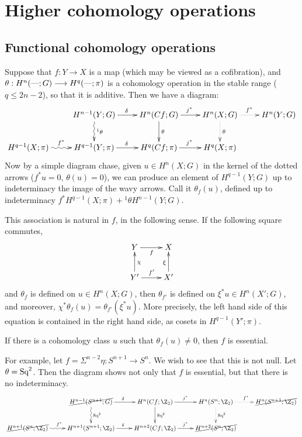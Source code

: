 \documentclass[11pt]{article}
\begin{document}
\section{Higher cohomology operations}
\subsection{Functional cohomology operations}
Suppose that $f:Y\to X$ is a map (which may be viewed as a cofibration), and 
$\theta:H^n(\textup{---};G)\longrightarrow H^q(\textup{---};\pi)$ is a cohomology operation in the stable
range ($q\leq2n-2$), so that it is additive.
Then we have a diagram:
\[\xymatrix{
&H^{n-1}(Y;G)\ar[r]^\delta\ar@{~>}[d]^{^1\theta}&
H^n(Cf;G)\ar[r]^{j^*}\ar[d]^\theta&
H^n(X;G)\ar@{.>}[r]^{f^*}\ar@{.>}[d]^\theta&
H^n(Y;G)\\
H^{q-1}(X;\pi)\ar@{~>}[r]^{f^*}&
H^{q-1}(Y;\pi)\ar[r]^\delta&
H^q(Cf;\pi)\ar[r]^{j^*}&
H^q(X;\pi)
}\]
Now by a simple diagram chase, given $u\in H^n(X;G)$ in the kernel of the dotted
arrows ($f^*u=0,\,\theta(u)=0$), we can produce an element of $H^{q-1}(Y;G)$ up
to indeterminacy the image of the wavy arrows. Call it $\theta_f(u)$, defined up
to indeterminacy $f^*H^{q-1}(X;\pi)+{^1\theta}H^{n-1}(Y;G)$.

This association is natural in $f$, in the following sense. If the following
square commutes,
\[\xymatrix{
Y\ar[r]_f& X\\
Y'\ar[r]^{f'}\ar[u]_\chi&X'\ar[u]^\xi
}\]
and $\theta_f$ is defined on $u\in H^n(X;G)$, then $\theta_{f'}$ is defined on
$\xi^*u\in H^n(X';G)$, and moreover, $\chi^*\theta_f(u)=\theta_{f'}(\xi^*u)$.
More precisely, the left hand side of this equation is contained in the right
hand side, as cosets in $H^{q-1}(Y';\pi)$.
\begin{prop*}
If there is a cohomology class $u$ such that $\theta_f(u)\neq0$, then $f$ is
essential.
\end{prop*}
For example, let $f=\Sigma^{n-2}\eta:S^{n+1}\to S^n$. We wish to see that this
is not null. Let $\theta=\textup{Sq}^2$. Then the diagram shows not only that $f$ is
essential, but that there is no indeterminacy.
\[\xymatrix{
&\cancel{H^{n-1}(S^{n+1};G)}\ar[r]^\delta\ar@{~>}[d]^{\Squ^2}&
H^n(Cf;\Z_2)\ar[r]^{j^*}\ar[d]^{\Squ^2}&
H^n(S^n;\Z_2)\ar@{.>}[r]^{f^*}\ar@{.>}[d]^{\Squ^2}&
\cancel{H^n(S^{n+1};\Z_2)}\\
\cancel{H^{n+1}(S^n;\Z_2)}\ar@{~>}[r]^{f^*}&
H^{n+1}(S^{n+1};\Z_2)\ar[r]^\delta&
H^{n+2}(Cf;\Z_2)\ar[r]^{j^*}&
\cancel{H^{n+2}(S^n;\Z_2)}
}\]
\end{document}
